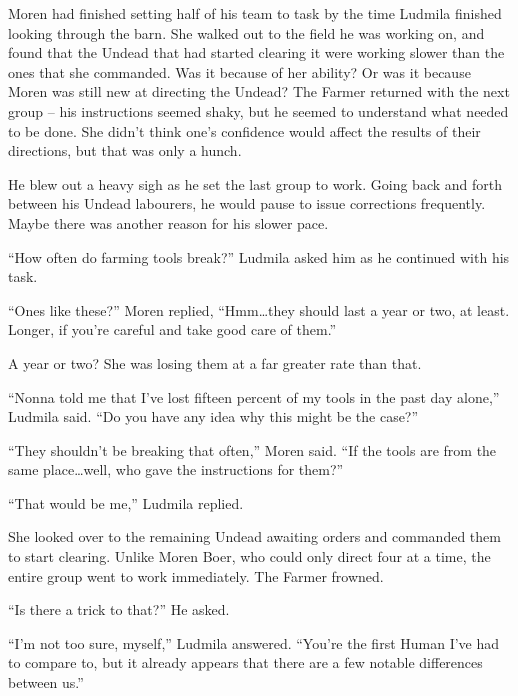  

Moren had finished setting half of his team to task by the time Ludmila finished looking through the barn. She walked out to the field he was working on, and found that the Undead that had started clearing it were working slower than the ones that she commanded. Was it because of her ability? Or was it because Moren was still new at directing the Undead? The Farmer returned with the next group – his instructions seemed shaky, but he seemed to understand what needed to be done. She didn’t think one’s confidence would affect the results of their directions, but that was only a hunch.

 

He blew out a heavy sigh as he set the last group to work. Going back and forth between his Undead labourers, he would pause to issue corrections frequently. Maybe there was another reason for his slower pace.

 

“How often do farming tools break?” Ludmila asked him as he continued with his task.

 

“Ones like these?” Moren replied, “Hmm…they should last a year or two, at least. Longer, if you’re careful and take good care of them.”

 

A year or two? She was losing them at a far greater rate than that.

 

“Nonna told me that I’ve lost fifteen percent of my tools in the past day alone,” Ludmila said. “Do you have any idea why this might be the case?”

 

“They shouldn’t be breaking that often,” Moren said. “If the tools are from the same place…well, who gave the instructions for them?”

 

“That would be me,” Ludmila replied.

 

She looked over to the remaining Undead awaiting orders and commanded them to start clearing. Unlike Moren Boer, who could only direct four at a time, the entire group went to work immediately. The Farmer frowned.

 

“Is there a trick to that?” He asked.

 

“I’m not too sure, myself,” Ludmila answered. “You’re the first Human I’ve had to compare to, but it already appears that there are a few notable differences between us.”

